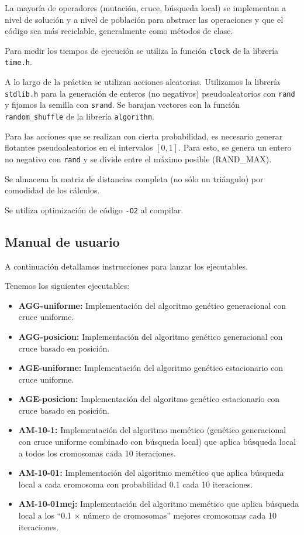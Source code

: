 \documentclass{article}
\begin{document}
La mayoría de operadores (mutación, cruce, búsqueda local) se implementan a nivel de solución y a nivel de población para abstraer
las operaciones y que el código sea más reciclable, generalmente como métodos de clase.

Para medir los tiempos de ejecución se utiliza la función \texttt{clock} de la librería \texttt{time.h}.

A lo largo de la práctica se utilizan acciones aleatorias. Utilizamos la librería \texttt{stdlib.h} para la generación de
enteros (no negativos) pseudoaleatorios con \texttt{rand} y fijamos la semilla con \texttt{srand}. Se barajan vectores con la función
 \texttt{random\_shuffle} de la librería \texttt{algorithm}.
 
Para las acciones que se realizan con cierta probabilidad, es necesario generar flotantes pseudoaleatorios en el intervalos $[0,1]$.
Para esto, se genera un entero no negativo con \texttt{rand} y se divide entre el máximo posible (RAND\_MAX).

Se almacena la matriz de distancias completa (no sólo un triángulo) por comodidad de los cálculos.

Se utiliza optimización de código \texttt{-O2} al compilar.

\subsection{Manual de usuario}

A continuación detallamos instrucciones para lanzar los ejecutables.

Tenemos los siguientes ejecutables:

\begin{itemize}
	\item \textbf{AGG-uniforme:} Implementación del algoritmo genético generacional con cruce uniforme.
	\item \textbf{AGG-posicion:} Implementación del algoritmo genético generacional con cruce basado en posición.
	\item \textbf{AGE-uniforme:} Implementación del algoritmo genético estacionario con cruce uniforme. 
	\item \textbf{AGE-posicion:} Implementación del algoritmo genético estacionario con cruce basado en posición.
	\item \textbf{AM-10-1:} Implementación del algoritmo memético (genético generacional con cruce uniforme combinado con búsqueda local) que aplica búsqueda local a todos los cromosomas cada 10 iteraciones.
	\item \textbf{AM-10-01:} Implementación del algoritmo memético que aplica búsqueda local a cada cromosoma con probabilidad 0.1 cada 10 iteraciones.
	\item \textbf{AM-10-01mej:} Implementación del algoritmo memético que aplica búsqueda local a los ``0.1 $\times$ número de cromosomas'' mejores cromosomas cada 10 iteraciones.
\end{itemize}
\end{document}
